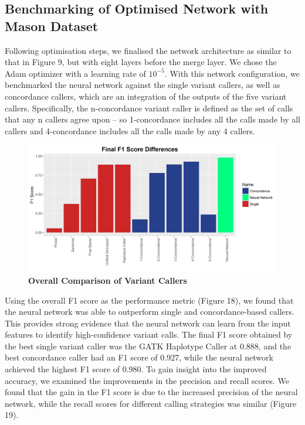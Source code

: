 \documentclass{article}
\begin{document}
\subsection{Benchmarking of Optimised Network with Mason Dataset}
Following optimisation steps, we finalised the network architecture as similar to that in Figure 9, but with eight layers before the merge layer. We chose the Adam optimizer with a learning rate of $10^{-5}$. With this network configuration, we benchmarked the neural network against the single variant callers, as well as concordance callers, which are an integration of the outputs of the five variant callers. Specifically, the n-concordance variant caller is defined as the set of calls that any n callers agree upon -- so 1-concordance includes all the calls made by all callers and 4-concordance includes all the calls made by any 4 callers.
\begin{figure}[H]
\includegraphics[width=\textwidth]{final_f1scores_results_all.jpg}
\caption{\textbf{Overall Comparison of Variant Callers}}
\centering
\end{figure}
Using the overall F1 score as the performance metric (Figure 18), we found that the neural network was able to outperform single and concordance-based callers. This provides strong evidence that the neural network can learn from the input features to identify high-confidence variant calls. The final F1 score obtained by the best single variant caller was the GATK Haplotype Caller at 0.888, and the best concordance caller had an F1 score of 0.927, while the neural network achieved the highest F1 score of 0.980. To gain insight into the improved accuracy, we examined the improvements in the precision and recall scores. We found that the gain in the F1 score is due to the increased precision of the neural network, while the recall scores for different calling strategies was similar (Figure 19). 
\end{document}
